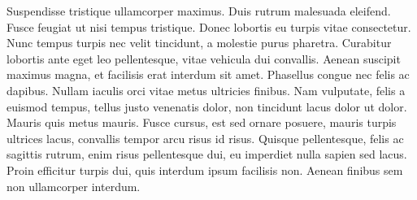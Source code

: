 \documentclass{article}
\begin{document}
Suspendisse tristique ullamcorper maximus. Duis rutrum malesuada eleifend. Fusce feugiat ut nisi tempus tristique. Donec lobortis eu turpis vitae consectetur. Nunc tempus turpis nec velit tincidunt, a molestie purus pharetra. Curabitur lobortis ante eget leo pellentesque, vitae vehicula dui convallis. Aenean suscipit maximus magna, et facilisis erat interdum sit amet. Phasellus congue nec felis ac dapibus. Nullam iaculis orci vitae metus ultricies finibus. Nam vulputate, felis a euismod tempus, tellus justo venenatis dolor, non tincidunt lacus dolor ut dolor. Mauris quis metus mauris. Fusce cursus, est sed ornare posuere, mauris turpis ultrices lacus, convallis tempor arcu risus id risus. Quisque pellentesque, felis ac sagittis rutrum, enim risus pellentesque dui, eu imperdiet nulla sapien sed lacus. Proin efficitur turpis dui, quis interdum ipsum facilisis non. Aenean finibus sem non ullamcorper interdum.
\end{document}
